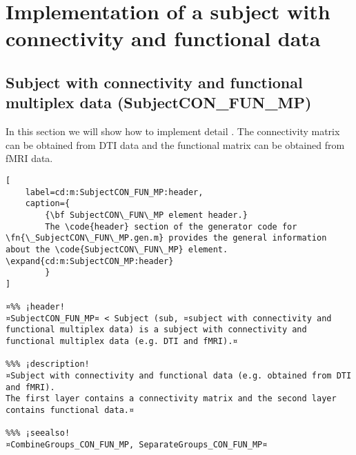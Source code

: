 \documentclass{tufte-handout}
\begin{document}
\clearpage
\section{Implementation of a subject with connectivity and functional data}

\subsection{Subject with connectivity and functional multiplex data (SubjectCON\_FUN\_MP)}

In this section we will show how to implement detail . The connectivity matrix can be obtained from DTI data and the functional matrix can be obtained from fMRI data.

\begin{lstlisting}[
	label=cd:m:SubjectCON_FUN_MP:header,
	caption={
		{\bf SubjectCON\_FUN\_MP element header.}
		The \code{header} section of the generator code for \fn{\_SubjectCON\_FUN\_MP.gen.m} provides the general information about the \code{SubjectCON\_FUN\_MP} element. \expand{cd:m:SubjectCON_MP:header}
		}
]

¤%% ¡header!
¤SubjectCON_FUN_MP¤ < Subject (sub, ¤subject with connectivity and functional multiplex data) is a subject with connectivity and functional multiplex data (e.g. DTI and fMRI).¤

%%% ¡description!
¤Subject with connectivity and functional data (e.g. obtained from DTI and fMRI).
The first layer contains a connectivity matrix and the second layer contains functional data.¤

%%% ¡seealso!
¤CombineGroups_CON_FUN_MP, SeparateGroups_CON_FUN_MP¤

\end{lstlisting}
\end{document}
